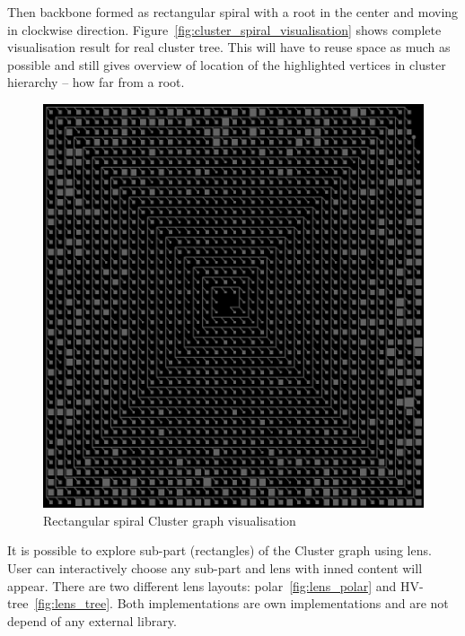 Then backbone formed as rectangular spiral with a root in the center and moving in clockwise direction. Figure~\ref{fig:cluster_spiral_visualisation} shows complete visualisation result for real cluster tree. This will have to reuse space as much as possible and still gives overview of location of the highlighted vertices in cluster hierarchy -- how far from a root.

\begin{figure}[h!]
\centering
\includegraphics[scale=0.4]{pictures/cluster_spiral_visualisation.png}
\caption{Rectangular spiral Cluster graph visualisation}
\label{fig:cluster_visualisation}
\end{figure}

It is possible to explore sub-part (rectangles) of the Cluster graph using lens. User can interactively choose any sub-part and lens with inned content will appear. There are two different lens layouts: polar~\ref{fig:lens_polar} and HV-tree~\ref{fig:lens_tree}. Both implementations are own implementations and are not depend of any external library.

